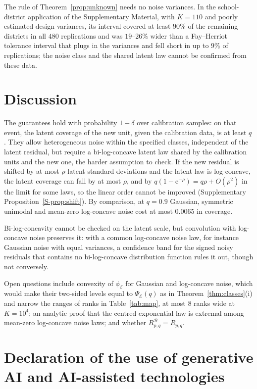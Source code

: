 \documentclass[lineno]{biometrika}
\begin{document}
The rule of Theorem~\ref{prop:unknown} needs no noise variances. In the school-district application of the Supplementary Material, with $K = 110$ and poorly estimated design variances, its interval covered at least $90\%$ of the remaining districts in all $480$ replications and was $19$--$26\%$ wider than a Fay--Herriot tolerance interval that plugs in the variances and fell short in up to $9\%$ of replications; the noise class and the shared latent law cannot be confirmed from these data.

\section{Discussion}\label{sec:discussion}

The guarantees hold with probability $1 - \delta$ over calibration samples: on that event, the latent coverage of the new unit, given the calibration data, is at least $q$. They allow heterogeneous noise within the specified classes, independent of the latent residual, but require a bi-log-concave latent law shared by the calibration units and the new one, the harder assumption to check. If the new residual is shifted by at most $\rho$ latent standard deviations and the latent law is log-concave, the latent coverage can fall by at most $\rho$, and by $q(1 - \mathrm{e}^{-\rho}) = q\rho + O(\rho^2)$ in the limit for some laws, so the linear order cannot be improved (Supplementary Proposition~\ref{S-prop:shift}). By comparison, at $q = 0.9$ Gaussian, symmetric unimodal and mean-zero log-concave noise cost at most $0.0065$ in coverage.

Bi-log-concavity cannot be checked on the latent scale, but convolution with log-concave noise preserves it: with a common log-concave noise law, for instance Gaussian noise with equal variances, a confidence band for the signed noisy residuals that contains no bi-log-concave distribution function \citep{dumbgen2017} rules it out, though not conversely.

Open questions include convexity of $\phi_{\mathcal E}$ for Gaussian and log-concave noise, which would make their two-sided levels equal to $\Psi_{\mathcal E}(q)$ as in Theorem~\ref{thm:classes}(i) and narrow the ranges of ranks in Table~\ref{tab:map}, at most $8$ ranks wide at $K = 10^4$; an analytic proof that the centred exponential law is extremal among mean-zero log-concave noise laws; and whether $R^{\mathcal B}_{p,q} = R_{p,q}$.

\section*{Declaration of the use of generative AI and AI-assisted technologies}
\end{document}
